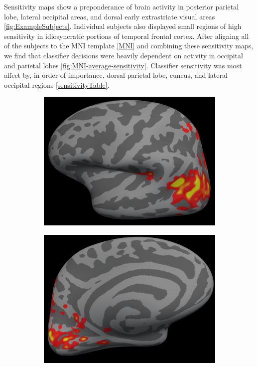 \documentclass[preprint,5p,authoryear]{elsarticle}
\begin{document}
Sensitivity maps show a preponderance of brain activity in posterior parietal lobe, lateral occipital areas, and dorsal early extrastriate visual areas \ref{fig:ExampleSubjects}. Individual subjects also displayed small regions of high sensitivity in idiosyncratic portions of temporal frontal cortex. After aligning all of the subjects to the MNI template \ref{MNI} and combining these sensitivity maps, we find that classifier decisions were heavily dependent on activity in occipital and parietal lobes \ref{fig:MNI-average-sensitivity}.  Classifier sensitivity was most affect by, in order of importance, dorsal parietal lobe, cuneus, and lateral occipital regions \ref{sensitivityTable}. 


\begin{figure}
\centering
\begin{subfigure}{0.4\textwidth}
\centering
\includegraphics[width=\textwidth]{figures/lh-lateral-smax-average}
\caption{}
\label{fig:lh-lateral-smax-average}
\end{subfigure}
\begin{subfigure}{0.4\textwidth}
\centering
\includegraphics[width=\textwidth]{figures/lh-medial-smax-average}

\end{subfigure}
\end{figure}
\end{document}

